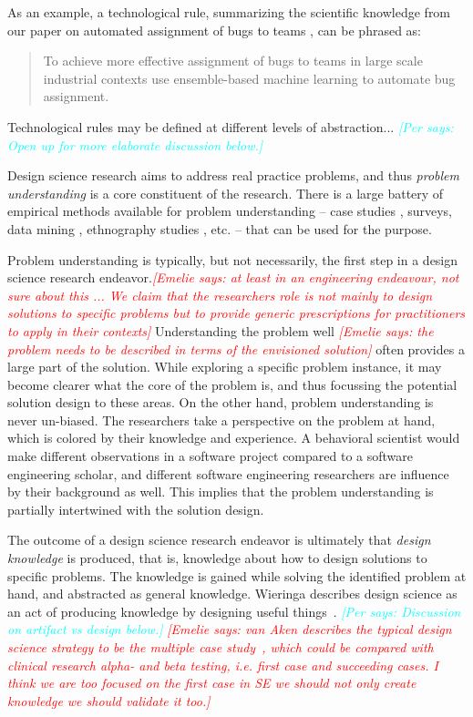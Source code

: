 \documentclass[graybox]{svmult}
\newcommand{\emelie}[1]{\textcolor{red}{{\it [Emelie says: #1]}}}
\newcommand{\per}[1]{\textcolor{cyan}{{\it [Per says: #1]}}}
\newcommand{\emelie}[1]{}
\newcommand{\per}[1]{}
\begin{document}
As an example, a technological rule, summarizing the scientific knowledge from our paper on automated assignment of bugs to teams \cite{JonssonBug15}, can be phrased as:
\begin{quote}{To achieve more effective assignment of bugs to teams in large scale industrial contexts use ensemble-based machine learning to automate bug assignment. \cite{StoreyESEM17}}\end{quote}

Technological rules may be defined at different levels of abstraction... \per{Open up for more elaborate discussion below.}


Design science research aims to address real practice problems, and thus \emph{problem understanding} is a core constituent of the research. There is a large battery of empirical methods available for problem understanding -- case studies \cite{Runeson12Case}, surveys, data mining \cite{MenziesDataMining2016}, ethnography studies \cite{SharpEthnography2016}, etc. -- that can be used for the purpose.

Problem understanding is typically, but not necessarily, the first step in a design science research endeavor.\emelie{at least in an engineering endeavour, not sure about this ... We claim that the researchers role is not mainly to design solutions to specific problems but to provide generic prescriptions for practitioners to apply in their contexts} Understanding the problem well \emelie{the problem needs to be described in terms of the envisioned solution} often provides a large part of the solution. While exploring a specific problem instance,   it may become clearer what the core of the problem is, and thus focussing the potential solution design to these areas. On the other hand, problem understanding is never un-biased. The researchers take a perspective on the problem at hand, which is colored by their knowledge and experience. A behavioral scientist would make different observations in a software project compared to a software engineering scholar, and different software engineering researchers are influence by their background as well. This implies that the problem understanding is partially intertwined with the solution design.

The outcome of a design science research endeavor is ultimately that \emph{design knowledge} is produced, that is, knowledge about how to design solutions to specific problems. The knowledge is gained while solving the identified problem at hand, and abstracted as general knowledge. Wieringa describes design science as an act of producing knowledge by designing useful things~\cite{wieringa_design_2009}. \per{Discussion on artifact vs design below.} \emelie{van Aken describes the typical design science strategy to be the multiple case study~\cite{aken_management_2004}, which could be compared with clinical research alpha- and beta testing, i.e. first case and succeeding cases. I think we are too focused on the first case in SE we should not only create knowledge we should validate it too.}
\end{document}
